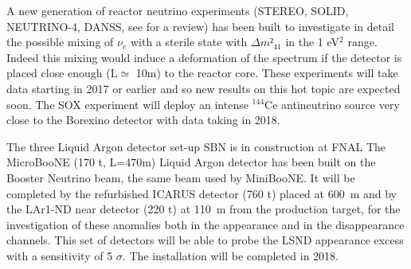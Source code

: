 A new generation of reactor neutrino experiments (STEREO, SOLID, NEUTRINO-4, DANSS, see \cite{othervsbl} for a review) has been built to investigate in detail the possible mixing of $\nu_e$ with a sterile state with $\Delta m²_{41}$ in the 1 eV$^2$ range.
Indeed this mixing would induce a deformation of the spectrum if the detector is placed close enough (L$\simeq$ 10m) to the reactor core. These experiments will take data starting in 2017 or earlier and so new results on this hot topic are expected soon.
The SOX experiment \cite{cribier} will deploy an intense $^{144}$Ce antineutrino source very close to the Borexino detector with data taking in 2018.

The three Liquid Argon detector set-up SBN \cite{sbnfnal} is in construction at FNAL The MicroBooNE (170 t, L=470m) Liquid Argon detector has been built on the Booster Neutrino beam, the same beam used by MiniBooNE. It will be completed by the refurbished ICARUS detector (760 t) placed at 600~m and by the LAr1-ND near detector (220 t)  at 110~m from the production target, for the investigation of these anomalies both in the appearance and in the disappearance channels. This set of detectors will be able to probe the LSND appearance excess with a sensitivity of 5 $\sigma$. The installation will be completed in 2018.    

